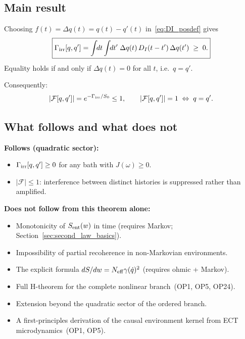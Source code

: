 \documentclass[11pt,a4paper]{article}
\numberwithin{equation}{section}
\begin{document}
\subsection*{Main result}

Choosing $f(t) = \Delta q(t) = q(t)-q'(t)$ in~\eqref{eq:DI_posdef}
gives
\begin{equation}
  \boxed{\Gamma_{\rm irr}[q,q']
  = \int\!\!dt\int\!\!dt'\;\Delta q(t)\,D_I(t-t')\,\Delta q(t')
  \;\geq\; 0.}
  \label{eq:Gamma_irr_proved}
\end{equation}
Equality holds if and only if $\Delta q(t)=0$ for all $t$,
i.e.\ $q=q'$.

Consequently:
\begin{equation}
  |\mathcal{F}[q,q']|
  = e^{-\Gamma_{\rm irr}/S_0}
  \leq 1,
  \qquad
  |\mathcal{F}[q,q']|=1 \;\Leftrightarrow\; q=q'.
\end{equation}

\subsection*{What follows and what does not}

\textbf{Follows (quadratic sector):}
\begin{itemize}
  \item $\Gamma_{\rm irr}[q,q']\geq 0$ for any bath with
    $J(\omega)\geq 0$.
  \item $|\mathcal{F}|\leq 1$: interference between distinct
    histories is suppressed rather than amplified.
\end{itemize}

\textbf{Does not follow from this theorem alone:}
\begin{itemize}
  \item Monotonicity of $S_{\rm ent}(w)$ in time
    (requires Markov; Section~\ref{sec:second_law_basics}).
  \item Impossibility of partial recoherence in non-Markovian
    environments.
  \item The explicit formula
    $dS/dw = N_{\rm eff}\gamma(\dot q)^2$
    (requires ohmic + Markov).
  \item Full H-theorem for the complete nonlinear branch~(OP1, OP5,
    OP24).
  \item Extension beyond the quadratic sector of the ordered branch.
  \item A first-principles derivation of the causal environment
    kernel from ECT microdynamics~(OP1, OP5).
\end{itemize}
\end{document}
